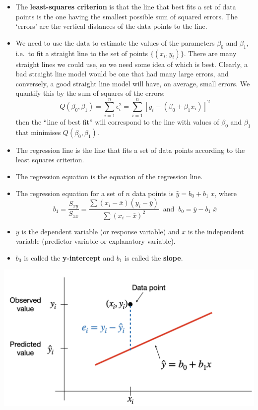 \documentclass[
]{article}
\begin{document}
\begin{itemize}
\item
  The \textbf{least-squares criterion} is that the line that best fits a
  set of data points is the one having the smallest possible sum of
  squared errors. The `errors' are the vertical distances of the data
  points to the line.
\item
  We need to use the data to estimate the values of the parameters
  \(\beta_0\) and \(\beta_1\), i.e.~to fit a straight line to the set of
  points \(\{(x_i , y_i )\}\). There are many straight lines we could
  use, so we need some idea of which is best. Clearly, a bad straight
  line model would be one that had many large errors, and conversely, a
  good straight line model will have, on average, small errors. We
  quantify this by the sum of squares of the errors:
  \[Q(\beta_0,\beta_1)=\sum_{i=1}^n \epsilon_i^2=\sum_{i=1}^n[y_i-(\beta_0 + \beta_1 x_i)]^2\]
  then the ``line of best fit'' will correspond to the line with values
  of \(\beta_0\) and \(\beta_1\) that minimises \(Q(\beta_0,\beta_1)\).
\item
  The regression line is the line that fits a set of data points
  according to the least squares criterion.
\item
  The regression equation is the equation of the regression line.
\item
  The regression equation for a set of \(n\) data points is
  \(\hat{y}=b_0+b_1\;x\), where
  \[b_1=\frac{S_{xy}}{S_{xx}}=\frac{\sum (x_i-\bar{x})(y_i-\bar{y})}{\sum (x_i-\bar{x})^2}
   \;\;\text{and}\;\; b_0=\bar{y}-b_1\; \bar{x}\]
\item
  \(y\) is the dependent variable (or response variable) and \(x\) is
  the independent variable (predictor variable or explanatory variable).
\item
  \(b_0\) is called the \textbf{y-intercept} and \(b_1\) is called the
  \textbf{slope}.
\end{itemize}

\begin{center}\includegraphics[width=0.6\linewidth,height=0.6\textheight]{figures/leastsq2} \end{center}
\end{document}
